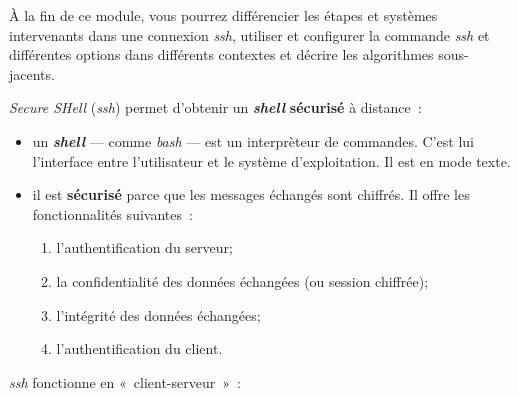 \documentclass[a4paper,11pt]{article}
\date{2018 -- 2019}
\begin{document}
\entete
\titre
{}
\lastedit

\dosecttoc
\setcounter{tocdepth}{1} 


\begin{tcolorbox}
	[blanker, before skip=10mm,after skip=10mm, 
		borderline west={1mm}{-4mm}{lightgray},
		title=Objectifs, coltitle=black, fonttitle=\sffamily\bfseries\large]

		À la fin de ce module, vous pourrez différencier les étapes et systèmes
		intervenants dans une connexion \textit{ssh}, utiliser et configurer la
		commande \textit{ssh} et différentes options dans différents contextes et
		décrire les algorithmes sous-jacents. 

\end{tcolorbox}

\vspace{-12mm}
\renewcommand{\contentsname}{}
\tableofcontents
\vspace{5mm}

\emph{Secure SHell} (\emph{ssh}) permet d'obtenir un \textbf{\emph{shell}}
\textbf{sécurisé} à distance~:

\begin{itemize}

	\item un \textbf{\emph{shell}} --- comme \emph{bash} --- est un interprèteur
		de commandes. C'est lui l'interface entre l'utilisateur et le système
		d'exploitation. Il est en mode texte.

	\item il est \textbf{sécurisé} parce que les messages échangés sont
		chiffrés. Il offre les fonctionnalités suivantes~:

		\begin{enumerate}
			\item l'authentification du serveur;
			\item la confidentialité des données échangées (ou session chiffrée);
			\item l'intégrité des données échangées;
			\item l'authentification du client.
		\end{enumerate}

\end{itemize}


\emph{ssh} fonctionne en «~client-serveur~»~:
\end{document}
